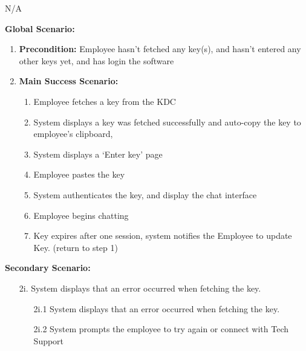 \documentclass[]{article}
\begin{document}
\begin{enumerate}[{\bf BE1.}]
\begin{enumerate}[{\bf BE9.}]
\begin{enumerate}[{\bf VP1.}]
            N/A \\
		\end{enumerate}
		{\bf Global Scenario:}\\
        \begin{enumerate}[{  }]
            \item \textbf{Precondition:} Employee hasn’t fetched any key(s), and hasn’t entered any other keys yet, and has login the software 
            \item \textbf{Main Success Scenario:}
            \begin{enumerate}[{  1.}]
                    \item Employee fetches a key from the KDC 
		    \item System displays a key was fetched successfully and auto-copy the key to employee’s clipboard,  
		    \item System displays a ‘Enter key’ page  
		    \item Employee pastes the key 
                    \item System authenticates the key, and display the chat interface 
		    \item Employee begins chatting 
                    \item Key expires after one session, system notifies the Employee to update Key. (return to step 1)   
            \end{enumerate}
        \end{enumerate}
	        \textbf{Secondary Scenario:}
                \begin{enumerate}
		
                    \item[2i.] System displays that an error occurred when fetching the key. 
                    \begin{enumerate}
                        \item[2i.1] System displays that an error occurred when fetching the key. 
                        \item[2i.2] System prompts the employee to try again or connect with Tech Support
                    \end{enumerate}
		    

\end{enumerate}
\end{enumerate}
\end{enumerate}
\end{document}
